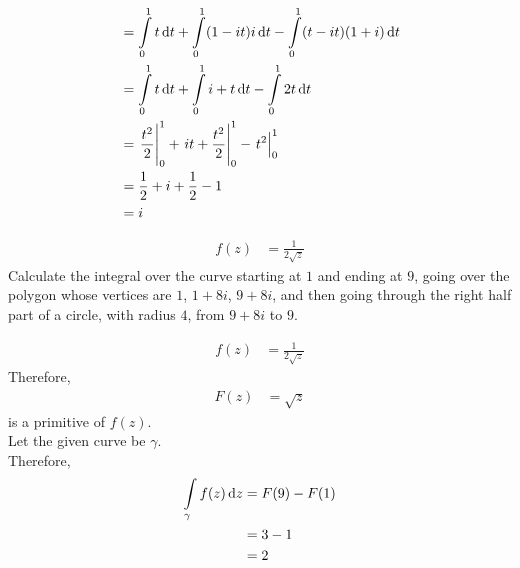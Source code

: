 \documentclass[fleqn, a4paper, 11pt, oneside]{amsart}
\theoremstyle{definition}
\theoremstyle{theorem}
\begin{document}
\begin{solution}
\begin{enumerate}[leftmargin=*]
\begin{align*}
                                                                         & = \int\limits_{0}^{1} t \dif t + \int\limits_{0}^{1} (1 - i t) i \dif t - \int\limits_{0}^{1} (t - i t) (1 + i) \dif t                                                            \\
                                                                         & = \int\limits_{0}^{1} t \dif t + \int\limits_{0}^{1} i + t \dif t - \int\limits_{0}^{1} 2 t \dif t                                                                                \\
                                                                         & = \left. \frac{t^2}{2} \right|_{0}^{1} + \left. i t + \frac{t^2}{2} \right|_{0}^{1} - \left. t^2 \right|_{0}^{1}                                                                  \\
                                                                         & = \frac{1}{2} + i + \frac{1}{2} - 1                                                                                                                                               \\
                                                                         & = i
			\end{align*}
	\end{enumerate}
\end{solution}

\setcounter{question}{6}
\begin{question}
	\begin{align*}
		f(z) & = \frac{1}{2 \sqrt{z}}
	\end{align*}
	Calculate the integral over the curve starting at $1$ and ending at $9$, going over the polygon whose vertices are $1$, $1 + 8 i$, $9 + 8 i$, and then going through the right half part of a circle, with radius $4$, from $9 + 8 i$ to $9$.
\end{question}

\begin{solution}
	\begin{align*}
		f(z) & = \frac{1}{2 \sqrt{z}}
	\end{align*}
	Therefore,
	\begin{align*}
		F(z) & = \sqrt{z}
	\end{align*}
	is a primitive of $f(z)$.\\
	Let the given curve be $\gamma$.\\
	Therefore,
	\begin{align*}
		\int\limits_{\gamma} f(z) \dif z & = F(9) - F(1) \\
                                                 & = 3 - 1       \\
                                                 & = 2
	\end{align*}
\end{solution}
\end{document}
